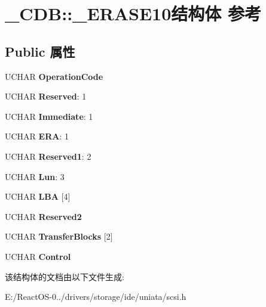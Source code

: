 \hypertarget{struct___c_d_b_1_1___e_r_a_s_e10}{}\section{\+\_\+\+C\+DB\+:\+:\+\_\+\+E\+R\+A\+S\+E10结构体 参考}
\label{struct___c_d_b_1_1___e_r_a_s_e10}
\subsection*{Public 属性}
\begin{DoxyCompactItemize}
\item 
\mbox{\label{struct___c_d_b_1_1___e_r_a_s_e10_a951e77543309709c6498d7b122573f76}} 
U\+C\+H\+AR {\bfseries Operation\+Code}
\item 
\mbox{\label{struct___c_d_b_1_1___e_r_a_s_e10_aa63b0968ce1f15699a21368cbd3a3c90}} 
U\+C\+H\+AR {\bfseries Reserved}\+: 1
\item 
\mbox{\label{struct___c_d_b_1_1___e_r_a_s_e10_abd2704e6f0e0629a7a94cf7fdbde210c}} 
U\+C\+H\+AR {\bfseries Immediate}\+: 1
\item 
\mbox{\label{struct___c_d_b_1_1___e_r_a_s_e10_a300f10e368ff7636ab7ed9104823e054}} 
U\+C\+H\+AR {\bfseries E\+RA}\+: 1
\item 
\mbox{\label{struct___c_d_b_1_1___e_r_a_s_e10_aab3499bb0e2bb97328a0ba6ae7116e9d}} 
U\+C\+H\+AR {\bfseries Reserved1}\+: 2
\item 
\mbox{\label{struct___c_d_b_1_1___e_r_a_s_e10_a4b8b3fca4b4392996f15134ef064c244}} 
U\+C\+H\+AR {\bfseries Lun}\+: 3
\item 
\mbox{\label{struct___c_d_b_1_1___e_r_a_s_e10_a71eeb04f0365cd88c8e43c70732bda7b}} 
U\+C\+H\+AR {\bfseries L\+BA} \mbox{[}4\mbox{]}
\item 
\mbox{\label{struct___c_d_b_1_1___e_r_a_s_e10_a40ec60da2d595258d9711ad11d888938}} 
U\+C\+H\+AR {\bfseries Reserved2}
\item 
\mbox{\label{struct___c_d_b_1_1___e_r_a_s_e10_ae0b1db61556d2cc83a7bea2927ce1c90}} 
U\+C\+H\+AR {\bfseries Transfer\+Blocks} \mbox{[}2\mbox{]}
\item 
\mbox{\label{struct___c_d_b_1_1___e_r_a_s_e10_a891d74f88d371cf1a81f2e956dc9a42b}} 
U\+C\+H\+AR {\bfseries Control}
\end{DoxyCompactItemize}


该结构体的文档由以下文件生成\+:\begin{DoxyCompactItemize}
\item 
E\+:/\+React\+O\+S-\/0../drivers/storage/ide/uniata/scsi.\+h\end{DoxyCompactItemize}
